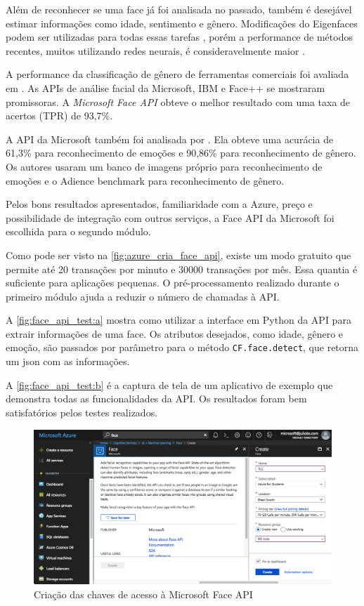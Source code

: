 Além de reconhecer se uma face já foi analisada no passado, também é desejável estimar informações como idade, sentimento e gênero. Modificações do Eigenfaces podem ser utilizadas para todas essas tarefas \cite{kekre2010face, calder2001principal, pantic2000automatic}, porém a performance de métodos recentes, muitos utilizando redes neurais, é consideravelmente maior \cite{duan2018hybrid, dehghan2017dager, gurnani2018vegac}.

A performance da classificação de gênero de ferramentas comerciais foi avaliada em \cite{buolamwini2018gender}. As APIs de análise facial da Microsoft, IBM e Face++ \cite{msftfaceapi, ibmwatson, Faceppapi} se mostraram promissoras. A \textit{Microsoft Face API} obteve o melhor resultado com uma taxa de acertos (TPR) de 93,7\%.

A API da Microsoft também foi analisada por \cite{dehghan2017dager}. Ela obteve uma acurácia de 61,3\% para reconhecimento de emoções e 90,86\% para reconhecimento de gênero. Os autores usaram um banco de imagens próprio para reconhecimento de emoções e o Adience benchmark para reconhecimento de gênero.

Pelos bons resultados apresentados, familiaridade com a Azure, preço e possibilidade de integração com outros serviços, a Face API da Microsoft foi escolhida para o segundo módulo.

Como pode ser visto na \autoref{fig:azure_cria_face_api}, existe um modo gratuito que permite até 20 transações por minuto e 30000 transações por mês. Essa quantia é suficiente para aplicações pequenas. O pré-processamento realizado durante o primeiro módulo ajuda a reduzir o número de chamadas à API.

A \autoref{fig:face_api_test:a} mostra como utilizar a interface em Python da API para extrair informações de uma face. Os atributos desejados, como idade, gênero e emoção, são passados por parâmetro para o método \texttt{CF.face.detect}, que retorna um json com as informações.

A \autoref{fig:face_api_test:b} é a captura de tela de um aplicativo de exemplo que demonstra todas as funcionalidades da API. Os resultados foram bem satisfatórios pelos testes realizados.

\begin{figure}[htbp]
    \centering
    \caption{Criação das chaves de acesso à Microsoft Face API}
    \label{fig:azure_cria_face_api}
    \includegraphics[width=0.95\linewidth]{imagens/azure_cria_face_api.png}
\end{figure}

